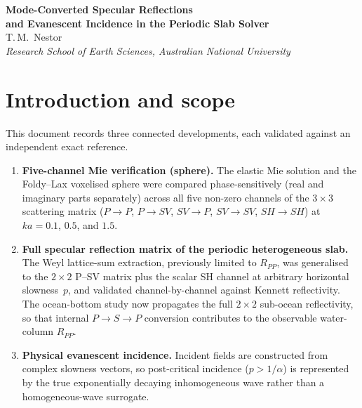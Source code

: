 \documentclass[11pt,a4paper]{article}
\begin{document}
\thispagestyle{plain}
\begin{center}
\vspace*{1em}
{\LARGE\bfseries Mode-Converted Specular Reflections\\[0.3em]
and Evanescent Incidence in the Periodic Slab Solver}\\[1.8em]
{\large T.\,M.\ Nestor}\\[0.5em]
{\itshape Research School of Earth Sciences, Australian National University}\\[2em]
\end{center}

\section{Introduction and scope}
\label{sec:intro}

This document records three connected developments, each validated
against an independent exact reference.

\begin{enumerate}
\item \textbf{Five-channel Mie verification (sphere).}  The elastic Mie
  solution and the Foldy--Lax voxelised sphere were compared
  phase-sensitively (real and imaginary parts separately) across all
  five non-zero channels of the $3\times 3$ scattering matrix
  ($P{\to}P$, $P{\to}SV$, $SV{\to}P$, $SV{\to}SV$, $SH{\to}SH$) at
  $ka = 0.1$, $0.5$, and $1.5$.
\item \textbf{Full specular reflection matrix of the periodic
  heterogeneous slab.}  The Weyl lattice-sum extraction, previously
  limited to $R_{PP}$, was generalised to the $2\times 2$ P--SV matrix
  plus the scalar SH channel at arbitrary horizontal slowness~$p$, and
  validated channel-by-channel against Kennett reflectivity.  The
  ocean-bottom study now propagates the full $2\times 2$ sub-ocean
  reflectivity, so that internal $P{\to}S{\to}P$ conversion contributes
  to the observable water-column $R_{PP}$.
\item \textbf{Physical evanescent incidence.}  Incident fields are
  constructed from complex slowness vectors, so post-critical incidence
  ($p > 1/\alpha$) is represented by the true exponentially decaying
  inhomogeneous wave rather than a homogeneous-wave surrogate.
\end{enumerate}
\end{document}
